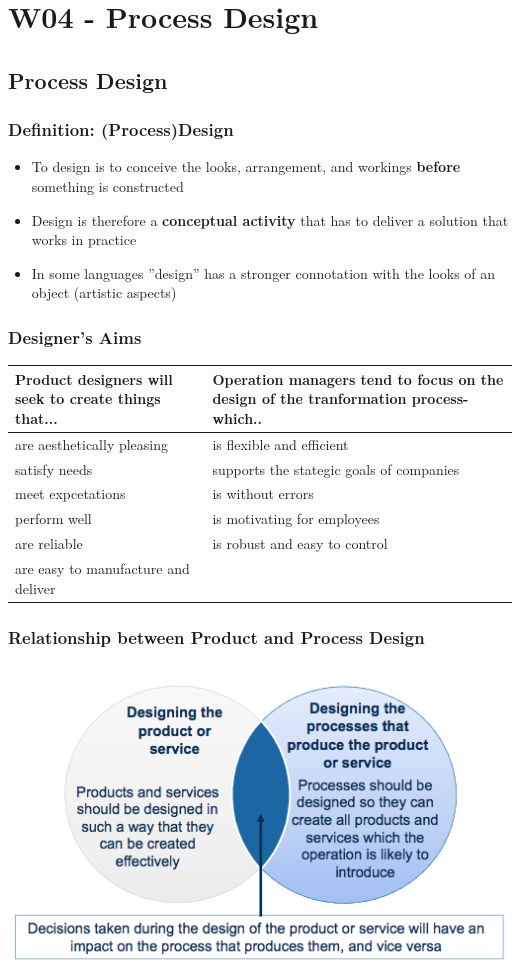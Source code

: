 \section{W04 - Process Design}
 
\subsection{Process Design}
\subsubsection{Definition: (Process)Design}
\begin{itemize}
\item To design is to conceive the looks, arrangement, and
workings \textbf{before} something is constructed
\item Design is therefore a \textbf{conceptual activity} that has to
deliver a solution that works in practice
\item In some languages ''design'' has a stronger connotation
with the looks of an object (artistic aspects)
\end{itemize}
\subsubsection{Designer’s Aims}
\begin{tabular}{|p{7cm}|p{7cm}|}
	\hline Product designers will seek to create things that... &  Operation managers tend to focus on the design of the tranformation process- which..\\ 
	\hline  
	are aesthetically pleasing& is flexible and efficient \\ 
	satisfy needs& supports the stategic goals of companies \\ 
	meet expcetations& is without errors \\ 
	perform well& is motivating for employees \\ 
	are reliable& is robust and easy to control \\ 
	are easy to manufacture and deliver	&  \\ 
	\hline 
\end{tabular} 
\subsubsection{Relationship between Product and Process Design}
\includegraphics[width=1\textwidth]{W04/product_process_design}
